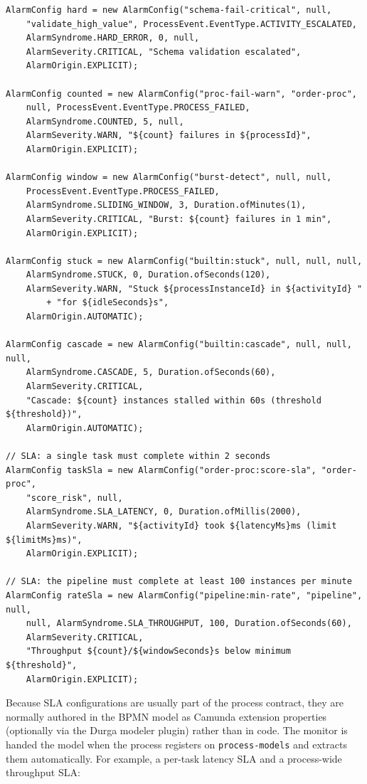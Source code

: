 \begin{verbatim}
AlarmConfig hard = new AlarmConfig("schema-fail-critical", null,
    "validate_high_value", ProcessEvent.EventType.ACTIVITY_ESCALATED,
    AlarmSyndrome.HARD_ERROR, 0, null,
    AlarmSeverity.CRITICAL, "Schema validation escalated",
    AlarmOrigin.EXPLICIT);

AlarmConfig counted = new AlarmConfig("proc-fail-warn", "order-proc",
    null, ProcessEvent.EventType.PROCESS_FAILED,
    AlarmSyndrome.COUNTED, 5, null,
    AlarmSeverity.WARN, "${count} failures in ${processId}",
    AlarmOrigin.EXPLICIT);

AlarmConfig window = new AlarmConfig("burst-detect", null, null,
    ProcessEvent.EventType.PROCESS_FAILED,
    AlarmSyndrome.SLIDING_WINDOW, 3, Duration.ofMinutes(1),
    AlarmSeverity.CRITICAL, "Burst: ${count} failures in 1 min",
    AlarmOrigin.EXPLICIT);

AlarmConfig stuck = new AlarmConfig("builtin:stuck", null, null, null,
    AlarmSyndrome.STUCK, 0, Duration.ofSeconds(120),
    AlarmSeverity.WARN, "Stuck ${processInstanceId} in ${activityId} "
        + "for ${idleSeconds}s",
    AlarmOrigin.AUTOMATIC);

AlarmConfig cascade = new AlarmConfig("builtin:cascade", null, null, null,
    AlarmSyndrome.CASCADE, 5, Duration.ofSeconds(60),
    AlarmSeverity.CRITICAL,
    "Cascade: ${count} instances stalled within 60s (threshold ${threshold})",
    AlarmOrigin.AUTOMATIC);

// SLA: a single task must complete within 2 seconds
AlarmConfig taskSla = new AlarmConfig("order-proc:score-sla", "order-proc",
    "score_risk", null,
    AlarmSyndrome.SLA_LATENCY, 0, Duration.ofMillis(2000),
    AlarmSeverity.WARN, "${activityId} took ${latencyMs}ms (limit ${limitMs}ms)",
    AlarmOrigin.EXPLICIT);

// SLA: the pipeline must complete at least 100 instances per minute
AlarmConfig rateSla = new AlarmConfig("pipeline:min-rate", "pipeline", null,
    null, AlarmSyndrome.SLA_THROUGHPUT, 100, Duration.ofSeconds(60),
    AlarmSeverity.CRITICAL,
    "Throughput ${count}/${windowSeconds}s below minimum ${threshold}",
    AlarmOrigin.EXPLICIT);
\end{verbatim}

Because SLA configurations are usually part of the process contract, they are
normally authored in the BPMN model as Camunda extension properties (optionally
via the Durga modeler plugin) rather than in code. The monitor is handed the
model when the process registers on \texttt{process-models} and extracts them
automatically. For example, a per-task latency SLA and a process-wide throughput
SLA:

